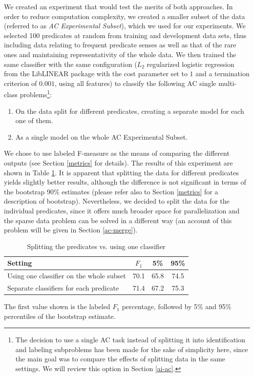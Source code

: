 \documentclass[12pt,notitlepage]{report}
\begin{document}
We created an experiment that would test the merits of both approaches. In order to reduce computation complexity, we created a smaller subset of the data (referred to as \emph{AC Experimental Subset}), which we used for our experiments. We selected 100 predicates at random from training and development data sets, thus including data relating to frequent predicate senses as well as that of the rare ones and maintaining representativity of the whole data. We then trained the same classifier with the same configuration ($L_2$ regularized logistic regression from the LibLINEAR package with the cost parameter set to $1$ and a termination criterion of $0.001$, using all features) to classify the following AC single multi-class problems\footnote{The decision to use a single AC task instead of splitting it into identification and labeling subproblems has been made for the sake of simplicity here, since the main goal was to compare the effects of splitting data in the same settings. We will review this option in Section \ref{ai-ac}.}:
\begin{enumerate}
    \item On the data split for different predicates, creating a separate model for each one of them.
    \item As a single model on the whole AC Experimental Subset.
\end{enumerate}
We chose to use labeled F-measure as the means of comparing the different outputs (see Section \ref{metrics} for details). The results of this experiment are shown in Table \ref{tab:one-bag}. It is apparent that splitting the data for different predicates yields slightly better results, although the difference is not significant in terms of the bootstrap 90\% estimates (please refer also to Section \ref{metrics} for a description of bootstrap). Nevertheless, we decided to split the data for the individual predicates, since it offers much broader space for parallelization and the sparse data problem can be solved in a different way (an account of this problem will be given in Section \ref{ac-merge}).

\begin{table}[htb]\label{tab:one-bag}
\caption{Splitting the predicates vs. using one classifier}\footnotesize
\begin{center}
\begin{tabular}{|l|c|c|c|}\hline
\bf Setting & $F_1$ & \bf 5\% & \bf 95\% \\\hline
Using one classifier on the whole subset & 70.1 & 65.8 & 74.5 \\
Separate classifiers for each predicate &  71.4 & 67.2 & 75.3 \\\hline
\end{tabular}
\end{center}
The first value shown is the labeled $F_1$ percentage, followed by 5\% and 95\% percentiles of the bootstrap estimate.
\end{table}
\end{document}
